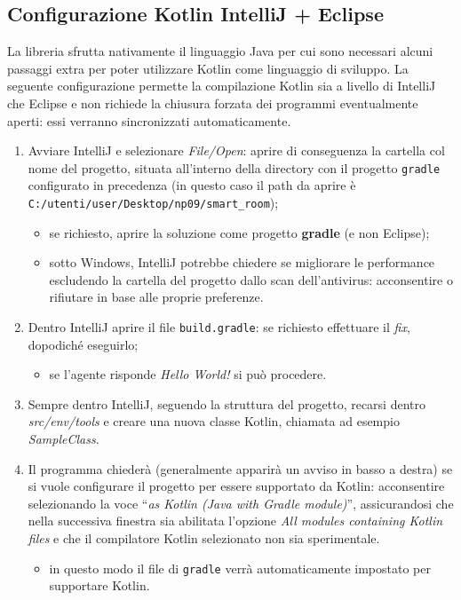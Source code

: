 \documentclass[12pt,a4paper,openright,oneside]{report}
\newcommand{\quotes}[1]{``#1''}
\begin{document}
\subsection{Configurazione Kotlin IntelliJ + Eclipse}
La libreria sfrutta nativamente il linguaggio Java per cui sono necessari alcuni passaggi extra per poter utilizzare Kotlin come linguaggio di sviluppo. La seguente configurazione permette la compilazione Kotlin sia a livello di IntelliJ che Eclipse e non richiede la chiusura forzata dei programmi eventualmente aperti: essi verranno sincronizzati automaticamente.

\begin{enumerate}
	\item Avviare IntelliJ e selezionare \textit{File/Open}: aprire di conseguenza la cartella col nome del progetto, situata all'interno della directory con il progetto \texttt{gradle} configurato in precedenza (in questo caso il path da aprire è  \texttt{C:/utenti/user/Desktop/np09/smart\_room});
	
	\begin{itemize}
		\item se richiesto, aprire la soluzione come progetto \textbf{gradle} (e non Eclipse);
		
		\item sotto Windows, IntelliJ potrebbe chiedere se migliorare le performance escludendo la cartella del progetto dallo scan dell'antivirus: acconsentire o rifiutare in base alle proprie preferenze.
	\end{itemize}

	\item Dentro IntelliJ aprire il file \texttt{build.gradle}: se richiesto effettuare il \textit{fix}, dopodiché eseguirlo;
	\begin{itemize}
		\item se l'agente risponde \textit{Hello World!} si può procedere.
	\end{itemize}

	\item Sempre dentro IntelliJ, seguendo la struttura del progetto, recarsi dentro \textit{src/env/tools} e creare una nuova classe Kotlin, chiamata ad esempio \textit{SampleClass}.
	
	\item Il programma chiederà (generalmente apparirà un avviso in basso a destra) se si vuole configurare il progetto per essere supportato da Kotlin: acconsentire selezionando la voce \quotes{\textit{as Kotlin (Java with Gradle module)}}, assicurandosi che nella successiva finestra sia abilitata l'opzione \textit{All modules containing Kotlin files} e che il compilatore Kotlin selezionato non sia sperimentale.
	\begin{itemize}
		\item in questo modo il file di \texttt{gradle} verrà automaticamente impostato per supportare Kotlin.
	\end{itemize}


\end{enumerate}
\end{document}
